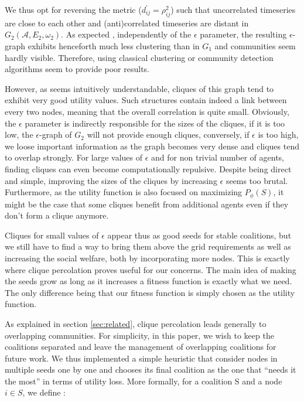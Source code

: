 \documentclass[conference]{IEEEtran}
\begin{document}
We thus opt for reversing the metric ($ d_{ij}^{'} = \rho_{ij}^{2} $) such that uncorrelated timeseries are close to each other and (anti)correlated timeseries are distant in $ G_{2}(\mathcal{A},E_{2},\omega_{2}) $. As expected \cite{Onnela2004}, independently of the $ \epsilon $ parameter, the resulting $ \epsilon $-graph exhibits henceforth much less clustering than in $ G_{1} $ and communities seem hardly visible. Therefore, using classical clustering or community detection algorithms seem to provide poor results. 

However, as seems intuitively understandable, cliques of this graph tend to exhibit very good utility values. Such  structures contain indeed a link between every two nodes, meaning that the overall correlation is quite small. Obviously, the $ \epsilon $ parameter is indirectly responsible for the sizes of the cliques, if it is too low, the $\epsilon$-graph of $ G_{2} $ will not provide enough cliques, conversely, if $\epsilon $ is too high, we loose important information as the graph becomes very dense and cliques tend to overlap strongly. For large values of $ \epsilon $ and for non trivial number of agents, finding cliques can even become computationally repulsive. Despite being direct and simple, improving the sizes of the cliques by increasing $ \epsilon $ seems too brutal. Furthermore, as the utility function is also focused on maximizing $ P_{\phi}(S) $, it might be the case that some cliques benefit from additional agents even if they don't form a clique anymore.

Cliques for small values of $ \epsilon $ appear thus as good seeds for stable coalitions, but we still have to find a way to bring them above the grid requirements as well as increasing the social welfare, both by incorporating more nodes. This is exactly where clique percolation proves useful for our concerns. The main idea of making the seeds grow as long as it increases a fitness function is exactly what we need. The only difference being that our fitness function is simply chosen as the utility function.  

As explained in section \ref{sec:related}, clique percolation leads generally to overlapping communities. For simplicity, in this paper, we wish to keep the coalitions separated and  leave the management of overlapping coalitions for future work. We thus implemented a simple heuristic that consider nodes in multiple seeds one by one and chooses its final coalition as the one that “needs it the most” in terms of utility loss. More formally, for a coalition S and a node $ i \in S $, we define :
\end{document}
